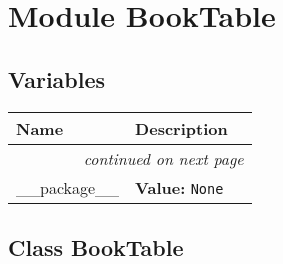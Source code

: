 %
%
%


\section{Module BookTable}

    \label{BookTable}


  \subsection{Variables}

    \vspace{-1cm}
\hspace{\varindent}\begin{longtable}{|p{\varnamewidth}|p{\vardescrwidth}|l}
\cline{1-2}
\cline{1-2} \centering \textbf{Name} & \centering \textbf{Description}& \\
\cline{1-2}
\endhead\cline{1-2}\multicolumn{3}{r}{\small\textit{continued on next page}}\\\endfoot\cline{1-2}
\endlastfoot\raggedright \_\-\_\-p\-a\-c\-k\-a\-g\-e\-\_\-\_\- & \raggedright \textbf{Value:} 
{\tt None}&\\
\cline{1-2}
\end{longtable}



\subsection{Class BookTable}

